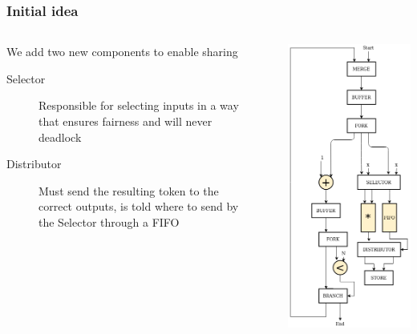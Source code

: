\documentclass{beamer}
\begin{document}
\begin{frame}[fragile]
\frametitle{Initial idea}
\begin{columns}[T]
    \begin{column}{0.45\textwidth}
    We add two new components to enable sharing \newline
    \begin{description}
        \item[Selector] Responsible for selecting inputs in a way that ensures fairness and will never deadlock
        \item[Distributor] Must send the resulting token to the correct outputs, is told where to send by the Selector through a FIFO
    \end{description}
    \end{column}
    \begin{column}{0.1\textwidth}
    \end{column}
    \begin{column}{0.45\textwidth}
      \includegraphics[scale=0.28]{shared_base_case.png}
    \end{column}
  \end{columns}
\end{frame}
\end{document}
